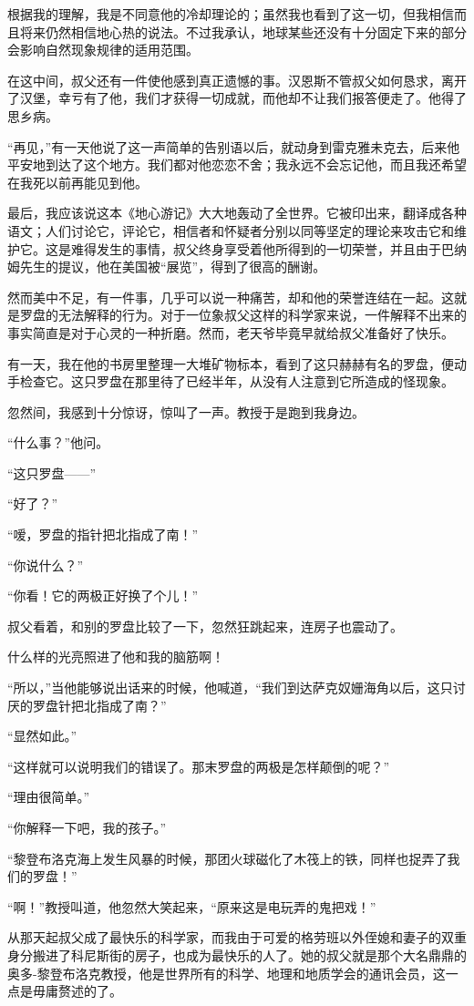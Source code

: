 \documentclass[10pt]{book}
\begin{document}
根据我的理解，我是不同意他的冷却理论的；虽然我也看到了这一切，但我相信而且将来仍然相信地心热的说法。不过我承认，地球某些还没有十分固定下来的部分会影响自然现象规律的适用范围。

在这中间，叔父还有一件使他感到真正遗憾的事。汉恩斯不管叔父如何恳求，离开了汉堡，幸亏有了他，我们才获得一切成就，而他却不让我们报答便走了。他得了思乡病。

“再见，”有一天他说了这一声简单的告别语以后，就动身到雷克雅未克去，后来他平安地到达了这个地方。我们都对他恋恋不舍；我永远不会忘记他，而且我还希望在我死以前再能见到他。

最后，我应该说这本《地心游记》大大地轰动了全世界。它被印出来，翻译成各种语文；人们讨论它，评论它，相信者和怀疑者分别以同等坚定的理论来攻击它和维护它。这是难得发生的事情，叔父终身享受着他所得到的一切荣誉，并且由于巴纳姆先生的提议，他在美国被“展览”，得到了很高的酬谢。

然而美中不足，有一件事，几乎可以说一种痛苦，却和他的荣誉连结在一起。这就是罗盘的无法解释的行为。对于一位象叔父这样的科学家来说，一件解释不出来的事实简直是对于心灵的一种折磨。然而，老天爷毕竟早就给叔父准备好了快乐。

有一天，我在他的书房里整理一大堆矿物标本，看到了这只赫赫有名的罗盘，便动手检查它。这只罗盘在那里待了已经半年，从没有人注意到它所造成的怪现象。

忽然间，我感到十分惊讶，惊叫了一声。教授于是跑到我身边。

“什么事？”他问。

“这只罗盘——”

“好了？”

“嗳，罗盘的指针把北指成了南！”

“你说什么？”

“你看！它的两极正好换了个儿！”

叔父看着，和别的罗盘比较了一下，忽然狂跳起来，连房子也震动了。

什么样的光亮照进了他和我的脑筋啊！

“所以，”当他能够说出话来的时候，他喊道，“我们到达萨克奴姗海角以后，这只讨厌的罗盘针把北指成了南？”

“显然如此。”

“这样就可以说明我们的错误了。那末罗盘的两极是怎样颠倒的呢？”

“理由很简单。”

“你解释一下吧，我的孩子。”

“黎登布洛克海上发生风暴的时候，那团火球磁化了木筏上的铁，同样也捉弄了我们的罗盘！”

“啊！”教授叫道，他忽然大笑起来，“原来这是电玩弄的鬼把戏！”

从那天起叔父成了最快乐的科学家，而我由于可爱的格劳班以外侄媳和妻子的双重身分搬进了科尼斯街的房子，也成为最快乐的人了。她的叔父就是那个大名鼎鼎的奥多-黎登布洛克教授，他是世界所有的科学、地理和地质学会的通讯会员，这一点是毋庸赘述的了。
\end{document}
